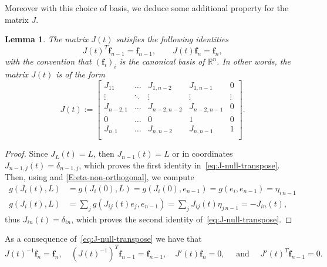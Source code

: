 \documentclass[12pt,a4paper]{amsart}
\theoremstyle{plain}
\newtheorem{lemma}{Lemma}[section]
\theoremstyle{definition}
\numberwithin{equation}{section}
\newcommand{\R}{\mathbb{R}}
\newcommand{\cbf}{\mathbf{f}}
\begin{document}
Moreover with this choice of basis, we deduce some additional property for the matrix $J$. 

\begin{lemma}\label{L:minorJ}
  The matrix $J(t)$ satisfies the following identities
%
\begin{equation} \label{eq:J-null-transpose}
 J(t)^T \cbf_{n-1}
  =
  \cbf_{n-1}, 
\qquad 
  J(t) \cbf_n
  = \cbf_n,
\end{equation}
%
with the convention that $(\cbf_i)_i$ is the canonical basis
of $\R^n$. In other words, the matrix $J(t)$ is of the form
\begin{equation}
  \label{eq:J-appearence}
  J(t)
  :=
  \begin{bmatrix}
    J_{11} & \dots & J_{1,n-2} & J_{1,n-1} &0\\
    \vdots & \ddots &\vdots &\vdots&\vdots\\
    J_{n-2,1}&\dots & J_{n-2,n-2} &J_{n-2,n-1} &0 \\
    0&\dots & 0 &1 &0 \\
    J_{n,1}&\dots & J_{n,n-2} &J_{n,n-1} &1 \\
  \end{bmatrix}
  .
\end{equation}
\end{lemma}


\begin{proof}
Since $J_L(t)=L$, then $J_{n-1}(t)=L$ or in coordinates
$J_{n-1,j}(t)=\delta_{n-1,j}$, which
proves the first identity in~\eqref{eq:J-null-transpose}.
Then,  using  and
\eqref{E:eta-non-orthogonal}, we compute
\begin{align*}
  g(J_i(t),L)
  &
    =
  g(J_i(0),L)
  =
  g(J_i(0),e_{n-1})
  =
  g(e_i,e_{n-1})
  =
    \eta_{i\,n-1}
  \\
 g(J_i(t),L) &
  =
  \sum_{j}
  g(J_{ij}(t) e_j,
  e_{n-1})
  =
    \sum_{j}
    J_{ij}(t) \eta_{j \,n-1}
    =
    -J_{in}(t)
  ,
\end{align*}
thus $J_{in}(t)=\delta_{in}$, which proves the second identity of~\eqref{eq:J-null-transpose}.
\end{proof}
%
As a consequence of~\eqref{eq:J-null-transpose} we have that
\begin{equation}
  \label{eq:properties-J}
  J(t)^{-1} \cbf_n= \cbf_n
  ,
  \quad
  (J(t)^{-1})^T \cbf_{n-1}= \cbf_{n-1}
  ,
  \quad
  J'(t) \cbf_n= 0
  ,
  \quad
  \text{ and }
  \quad
  J'(t)^T \cbf_{n-1}= 0.
\end{equation}
\end{document}
